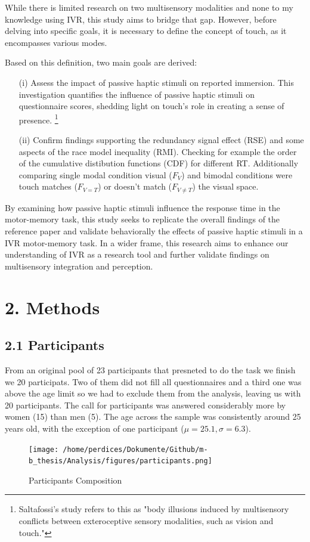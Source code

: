 \documentclass[12pt,oneside,openright]{report}
\begin{document}
While there is limited research on two multisensory modalities and none to my knowledge using IVR, this study aims to bridge that gap. However, before delving into specific goals, it is necessary to define the concept of touch, as it encompasses various modes.

 Based on this definition, two main goals are derived:

\begin{itemize}
  \item[(i)] Assess the impact of passive haptic stimuli on reported immersion. This investigation quantifies the influence of passive haptic stimuli on questionnaire scores, shedding light on touch's role in creating a sense of presence. 
  \footnote{Saltafossi's study refers to this as "body illusions induced by multisensory conflicts between exteroceptive sensory modalities, such as vision and touch."}
    
  \item[(ii)] Confirm findings supporting the redundancy signal effect (RSE) and some aspects of the race model inequality (RMI). Checking for example the order of the cumulative distibution functions (CDF) for different RT. Additionally comparing single modal condition visual ($F_V$) and bimodal conditions were touch matches ($F_{V=T}$) or doesn’t match ($F_{V \neq T}$) the visual space. 
\end{itemize}

By examining how passive haptic stimuli influence the response time in the motor-memory task, this study seeks to replicate the overall findings of the reference paper \parencite*{SALTAFOSSI2023108642} and validate behaviorally the effects of passive haptic stimuli in a IVR motor-memory task. In a wider frame, this research aims to enhance our understanding of IVR as a research tool and further validate findings on multisensory integration and perception.

\section*{2. Methods}
    \subsection*{2.1 Participants}
    From an original pool of 23 participants that presneted to do the task we finish we 20 participats. Two of them did not fill all questionnaires and a third one was above the age limit  so we had to exclude them from the analysis, leaving us with 20 participants. The call for participants was answered considerably more by women (15) than men (5). The age across the sample was consistently around 25 years old, with the exception of one participant ($\mu=25.1 , \sigma=6.3$).
    \begin{figure}[h]
        \centering
        \texttt{[image: /home/perdices/Dokumente/Github/m-b\_thesis/Analysis/figures/participants.png]}
        \caption{Participants Composition}
        \label{fig:mesh1}
    \end{figure}
    
\end{document}
